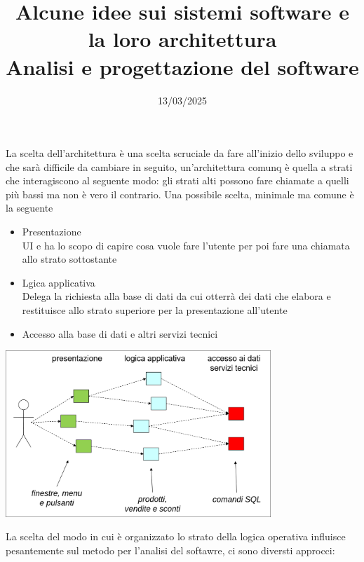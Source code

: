 \documentclass{article}
\title{Alcune idee sui sistemi software e la loro architettura\\\normalsize Analisi e progettazione del software}
\date{13/03/2025}
\begin{document}
\maketitle
La scelta dell'architettura è una scelta scruciale da fare all'inizio dello sviluppo e che sarà difficile da cambiare in seguito, un'architettura comunq è quella a strati che interagiscono al seguente modo: gli strati alti possono fare chiamate a quelli più bassi ma non è vero il contrario. Una possibile scelta, minimale ma comune è la seguente
\begin{itemize}
    \item Presentazione\\
        UI e ha lo scopo di capire cosa vuole fare l'utente per poi fare una chiamata allo strato sottostante
    \item Lgica applicativa\\
        Delega la richiesta alla base di dati da cui otterrà dei dati che elabora e restituisce allo strato superiore per la presentazione all'utente    
    \item Accesso alla base di dati e altri servizi tecnici
\end{itemize}
\begin{center}
    \includegraphics[width=10cm]{images/architettura a strati.png}
\end{center}
La scelta del modo in cui è organizzato lo strato della logica operativa influisce pesantemente sul metodo per l'analisi del softawre, ci sono diversti approcci:
\end{document}
